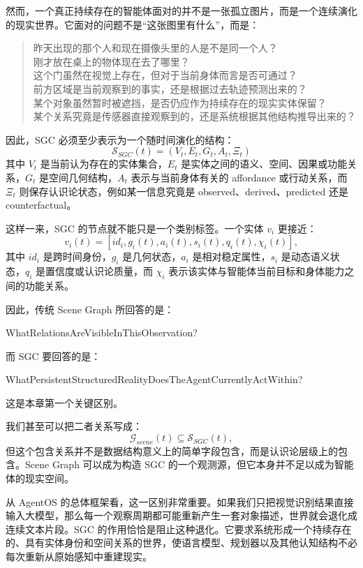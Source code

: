 然而，一个真正持续存在的智能体面对的并不是一张孤立图片，而是一个连续演化的现实世界。它面对的问题不是“这张图里有什么”，而是：
\begin{quote}
昨天出现的那个人和现在摄像头里的人是不是同一个人？\\
刚才放在桌上的物体现在去了哪里？\\
这个门虽然在视觉上存在，但对于当前身体而言是否可通过？\\
前方区域是当前观察到的事实，还是根据过去轨迹预测出来的？\\
某个对象虽然暂时被遮挡，是否仍应作为持续存在的现实实体保留？\\
某个关系究竟是传感器直接观察到的，还是系统根据其他结构推导出来的？
\end{quote}

因此，SGC 必须至少表示为一个随时间演化的结构：
\[
\boxed{
\mathcal{S}_{SGC}(t)
=
\left(
V_t,
E_t,
G_t,
A_t,
\Xi_t
\right)
}
\]
其中 \(V_t\) 是当前认为存在的实体集合，\(E_t\) 是实体之间的语义、空间、因果或功能关系，\(G_t\) 是空间几何结构，\(A_t\) 表示与当前身体有关的 affordance 或行动关系，而 \(\Xi_t\) 则保存认识论状态，例如某一信息究竟是 observed、derived、predicted 还是 counterfactual。

这样一来，SGC 的节点就不能只是一个类别标签。一个实体 \(v_i\) 更接近：
\[
v_i(t)
=
\left[
id_i,
g_i(t),
a_i(t),
s_i(t),
q_i(t),
\chi_i(t)
\right],
\]
其中 \(id_i\) 是跨时间身份，\(g_i\) 是几何状态，\(a_i\) 是相对稳定属性，\(s_i\) 是动态语义状态，\(q_i\) 是置信度或认识论质量，而 \(\chi_i\) 表示该实体与智能体当前目标和身体能力之间的功能关系。

因此，传统 Scene Graph 所回答的是：
\begin{statementbox}
WhatRelationsAreVisibleInThisObservation?
\end{statementbox}
而 SGC 要回答的是：
\begin{statementbox}
WhatPersistentStructuredRealityDoesTheAgentCurrentlyActWithin?
\end{statementbox}

这是本章第一个关键区别。

我们甚至可以把二者关系写成：
\[
\mathcal{G}_{scene}(t)
\subseteq
\mathcal{S}_{SGC}(t),
\]
但这个包含关系并不是数据结构意义上的简单字段包含，而是认识论层级上的包含。Scene Graph 可以成为构造 SGC 的一个观测源，但它本身并不足以成为智能体的现实空间。

从 AgentOS 的总体框架看，这一区别非常重要。如果我们只把视觉识别结果直接输入大模型，那么每一个观察周期都可能重新产生一套对象描述，世界就会退化成连续文本片段。SGC 的作用恰恰是阻止这种退化。它要求系统形成一个持续存在的、具有实体身份和空间关系的世界，使语言模型、规划器以及其他认知结构不必每次重新从原始感知中重建现实。

